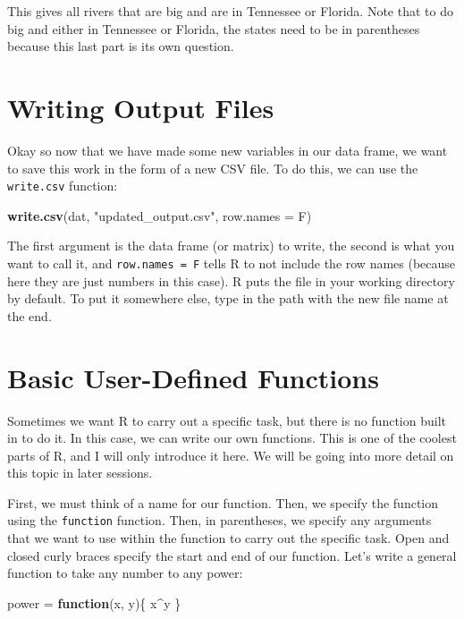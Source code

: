 \documentclass[]{book}
\newenvironment{Shaded}{\begin{snugshade}}{\end{snugshade}}
\newcommand{\KeywordTok}[1]{\textcolor[rgb]{0.13,0.29,0.53}{\textbf{#1}}}
\newcommand{\DataTypeTok}[1]{\textcolor[rgb]{0.13,0.29,0.53}{#1}}
\newcommand{\StringTok}[1]{\textcolor[rgb]{0.31,0.60,0.02}{#1}}
\newcommand{\ControlFlowTok}[1]{\textcolor[rgb]{0.13,0.29,0.53}{\textbf{#1}}}
\newcommand{\OperatorTok}[1]{\textcolor[rgb]{0.81,0.36,0.00}{\textbf{#1}}}
\newcommand{\NormalTok}[1]{#1}
\theoremstyle{definition}
\theoremstyle{definition}
\theoremstyle{definition}
\theoremstyle{remark}
\begin{document}
This gives all rivers that are big and are in Tennessee or Florida. Note
that to do big and either in Tennessee or Florida, the states need to be
in parentheses because this last part is its own question.

\chapter{Writing Output Files}\label{writing-output-files}

Okay so now that we have made some new variables in our data frame, we
want to save this work in the form of a new CSV file. To do this, we can
use the \texttt{write.csv} function:

\begin{Shaded}
\begin{Highlighting}[]
\KeywordTok{write.csv}\NormalTok{(dat, }\StringTok{"updated_output.csv"}\NormalTok{, }\DataTypeTok{row.names =}\NormalTok{ F)}
\end{Highlighting}
\end{Shaded}

The first argument is the data frame (or matrix) to write, the second is
what you want to call it, and \texttt{row.names\ =\ F} tells R to not
include the row names (because here they are just numbers in this case).
R puts the file in your working directory by default. To put it
somewhere else, type in the path with the new file name at the end.

\chapter{Basic User-Defined
Functions}\label{basic-user-defined-functions}

Sometimes we want R to carry out a specific task, but there is no
function built in to do it. In this case, we can write our own
functions. This is one of the coolest parts of R, and I will only
introduce it here. We will be going into more detail on this topic in
later sessions.

First, we must think of a name for our function. Then, we specify the
function using the \texttt{function} function. Then, in parentheses, we
specify any arguments that we want to use within the function to carry
out the specific task. Open and closed curly braces specify the start
and end of our function. Let's write a general function to take any
number to any power:

\begin{Shaded}
\begin{Highlighting}[]
\NormalTok{power =}\StringTok{ }\ControlFlowTok{function}\NormalTok{(x, y)\{}
\NormalTok{  x}\OperatorTok{^}\NormalTok{y}
\NormalTok{\}}
\end{Highlighting}
\end{Shaded}
\end{document}
